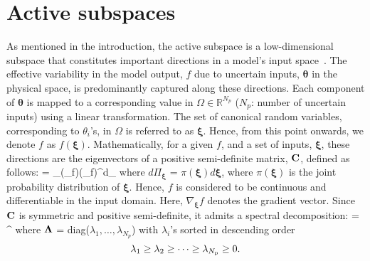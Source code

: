 
\section{Active subspaces}
\label{sub:ac}
As mentioned in the introduction, the active subspace is a low-dimensional subspace
that constitutes important directions in a model's input
space~\cite{Constantine:2015}. The effective variability in the model output, $f$
due to uncertain inputs, $\bm{\theta}$ in the physical space, is predominantly captured
along these directions. Each component of $\bm{\theta}$
is mapped to a corresponding value in $\Omega\in\mathbb{R}^{N_p}$
($N_p$: number of uncertain inputs)
using a linear transformation.  The set of canonical random variables, corresponding
to $\theta_i$'s, in $\Omega$ is referred to as $\bm{\xi}$.
Hence, from this point onwards, we denote $f$ as $f(\bm{\xi})$.
Mathematically, for a given $f$, and a set of inputs, $\bm{\xi}$,
these directions are the eigenvectors of a positive
semi-definite matrix, $\mathbf{{C}}$, defined as follows: 
%
\be
{} = \int_\Omega (\nabla_{\bm{\xi}}f)(\nabla_{\bm{\xi}}f)^\top d\Pi_{\bm{\xi}}
\label{eq:C}
\ee
%
where 
$d\Pi_{\bm{\xi}}$ = $\pi(\bm{\xi})d\bm{\xi}$, where $\pi(\bm{\xi})$ is the joint probability
distribution of $\bm{\xi}$. Hence, $f$ is considered to be continuous 
and differentiable in the input domain. 
Here,
$\nabla_{\bm{\xi}}f$ denotes the gradient vector. 
Since $\mathbf{{C}}$ is symmetric and
positive semi-definite, it admits a spectral decomposition:
%
\be
{} = \mat{\Lambda}^\top
\ee
%
where $\mathbf{{\Lambda}}$ = diag($\lambda_1,\ldots,\lambda_{N_p}$) with
$\lambda_i$'s sorted in descending order
\[
     \lambda_1 \geq \lambda_2 \geq \cdots \geq \lambda_{N_\text{p}} \geq 0.
\] 
